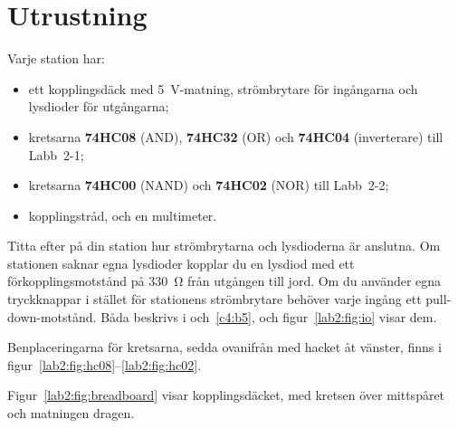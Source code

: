 \section{Utrustning}
\label{lab2:sec:equipment}
Varje station har:
\begin{itemize}
  \item ett kopplingsdäck med 5~V-matning, strömbrytare för ingångarna och lysdioder för
    utgångarna;
  \item kretsarna \textbf{74HC08} (AND), \textbf{74HC32} (OR) och \textbf{74HC04} (inverterare) till
    Labb~2-1;
  \item kretsarna \textbf{74HC00} (NAND) och \textbf{74HC02} (NOR) till Labb~2-2;
  \item kopplingstråd, och en multimeter.
\end{itemize}

Titta efter på din station hur strömbrytarna och lysdioderna är anslutna. Om stationen saknar egna
lysdioder kopplar du en lysdiod med ett förkopplingsmotstånd på 330~Ω från utgången till jord. Om
du använder egna tryckknappar i stället för stationens strömbrytare behöver varje ingång ett
pull-down-motstånd. Båda beskrivs i  och~\ref{c4:b5}, och figur~\ref{lab2:fig:io}
visar dem.


Benplaceringarna för kretsarna, sedda ovanifrån med hacket åt vänster, finns i
figur~\ref{lab2:fig:hc08}--\ref{lab2:fig:hc02}.






Figur~\ref{lab2:fig:breadboard} visar kopplingsdäcket, med kretsen över mittspåret och matningen
dragen.


